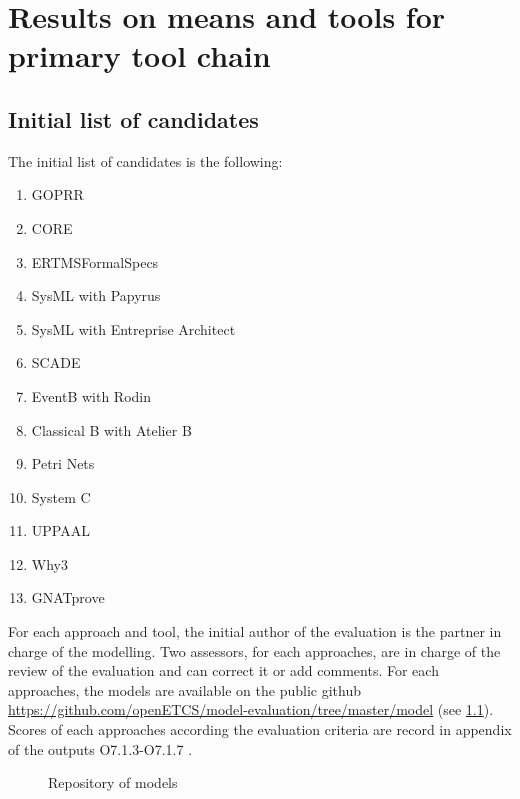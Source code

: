 \chapter{Results on means and tools for primary tool chain}
\label{sec:results}

\section{Initial  list of candidates}

The initial list of candidates is the following:


\begin{enumerate}

\item  GOPRR
\item  CORE
\item  ERTMSFormalSpecs
\item  SysML with Papyrus
\item  SysML with Entreprise Architect
\item  SCADE
\item  EventB with Rodin
\item  Classical B with Atelier B
\item  Petri Nets
\item  System C
\item  UPPAAL
\item  Why3
\item  GNATprove

\end{enumerate}

For each approach and tool, the initial  author of the evaluation is the partner in charge of the modelling. Two assessors, for each approaches,  are in charge of the review of the evaluation and can correct it or add comments. For each approaches, the models are available on the public github \url{https://github.com/openETCS/model-evaluation/tree/master/model} (see \ref{fig:models}).
Scores of each approaches according the evaluation criteria are record in appendix of the outputs O7.1.3-O7.1.7 \citep{WP7_O713_O717}.


 \begin{figure}
  \centering
  \caption{Repository of models}
  \label{fig:models}
\end{figure}



